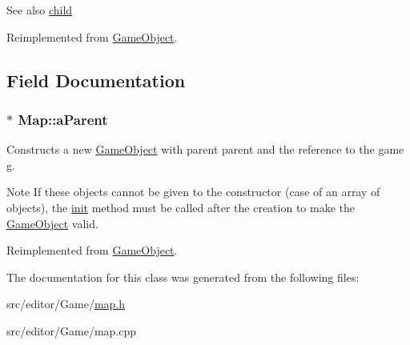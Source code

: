 \begin{DoxySeeAlso}{\-See also}
\hyperlink{class_game_object_a6ac392d25a490bee17b653a374ec94fc}{child} 
\end{DoxySeeAlso}


\-Reimplemented from \hyperlink{class_game_object_a3f68b64d3a0793048cfe5deab35397e0}{\-Game\-Object}.



\subsection{\-Field \-Documentation}
\hypertarget{class_map_ac0d4bf203db2a4372ea6923729f978f1}{
\subsubsection[{a\-Parent}]{$\ast$ {\bf \-Map\-::a\-Parent}}}\label{class_map_ac0d4bf203db2a4372ea6923729f978f1}
\-Constructs a new \hyperlink{class_game_object}{\-Game\-Object} with parent {\ttfamily parent} and the reference to the game {\ttfamily g}.

\begin{DoxyNote}{\-Note}
\-If these objects cannot be given to the constructor (case of an array of objects), the \hyperlink{class_game_object_a97be7b59b2e76e7d60de2146b894eed9}{init} method must be called after the creation to make the \hyperlink{class_game_object}{\-Game\-Object} valid. 
\end{DoxyNote}


\-Reimplemented from \hyperlink{class_game_object_a41d4afe43f955e78ede0bbd4ad8957f8}{\-Game\-Object}.



\-The documentation for this class was generated from the following files\-:\begin{DoxyCompactItemize}
\item 
src/editor/\-Game/\hyperlink{map_8h}{map.\-h}\item 
src/editor/\-Game/map.\-cpp\end{DoxyCompactItemize}
